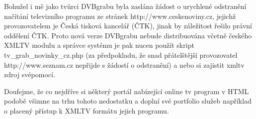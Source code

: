 \vspace{10pt}

Bohužel i mě jako tvůrci DVBgrabu byla zaslána žádost o urychlené odstranění načítání televizního programu ze stránek http://www.ceskenoviny.cz, jejichž provozovatelem je Česká tisková kancelář (ČTK), jinak by záležitost řešilo právní oddělení ČTK. Proto nová verze DVBgrabu nebude distribuována včetně českého XMLTV modulu a správce systému je pak nucen použít skript tv\_grab\_novinky\_cz.php (za předpokladu, že snad přátelštější provozovatel http://www.seznam.cz nepřijde s žádostí o odstranění) a nebo si zajistit xmltv zdroj svépomocí.

\vspace{10pt}

Doufejme, že co nejdříve si některý portál nabízející online tv program v HTML podobě všimne na trhu tohoto nedostatku a doplní své portfolio služeb například o placený přístup k XMLTV formátu jejich programu.
